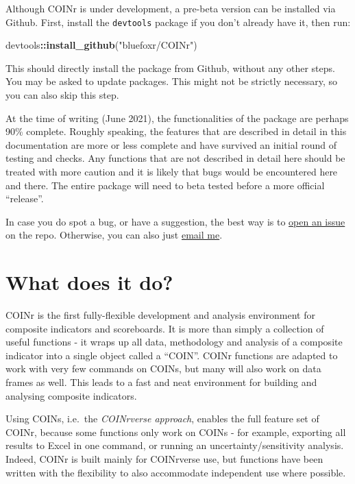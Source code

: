 \documentclass[
]{book}
\newenvironment{Shaded}{\begin{snugshade}}{\end{snugshade}}
\newcommand{\KeywordTok}[1]{\textcolor[rgb]{0.13,0.29,0.53}{\textbf{#1}}}
\newcommand{\NormalTok}[1]{#1}
\newcommand{\OperatorTok}[1]{\textcolor[rgb]{0.81,0.36,0.00}{\textbf{#1}}}
\newcommand{\StringTok}[1]{\textcolor[rgb]{0.31,0.60,0.02}{#1}}
\begin{document}
Although COINr is under development, a pre-beta version can be installed via Github. First, install the \texttt{devtools} package if you don't already have it, then run:

\begin{Shaded}
\begin{Highlighting}[]
\NormalTok{devtools}\OperatorTok{::}\KeywordTok{install_github}\NormalTok{(}\StringTok{"bluefoxr/COINr"}\NormalTok{)}
\end{Highlighting}
\end{Shaded}

This should directly install the package from Github, without any other steps. You may be asked to update packages. This might not be strictly necessary, so you can also skip this step.

At the time of writing (June 2021), the functionalities of the package are perhaps 90\% complete. Roughly speaking, the features that are described in detail in this documentation are more or less complete and have survived an initial round of testing and checks. Any functions that are not described in detail here should be treated with more caution and it is likely that bugs would be encountered here and there. The entire package will need to beta tested before a more official ``release''.

In case you do spot a bug, or have a suggestion, the best way is to \href{https://github.com/bluefoxr/COINr/issues}{open an issue} on the repo. Otherwise, you can also just \href{mailto:william.becker@bluefoxdata.eu}{email me}.

\hypertarget{what-does-it-do}{%
\section{What does it do?}\label{what-does-it-do}}

COINr is the first fully-flexible development and analysis environment for composite indicators and scoreboards. It is more than simply a collection of useful functions - it wraps up all data, methodology and analysis of a composite indicator into a single object called a ``COIN''. COINr functions are adapted to work with very few commands on COINs, but many will also work on data frames as well. This leads to a fast and neat environment for building and analysing composite indicators.

Using COINs, i.e.~the \emph{COINrverse approach}, enables the full feature set of COINr, because some functions only work on COINs - for example, exporting all results to Excel in one command, or running an uncertainty/sensitivity analysis. Indeed, COINr is built mainly for COINrverse use, but functions have been written with the flexibility to also accommodate independent use where possible.
\end{document}
